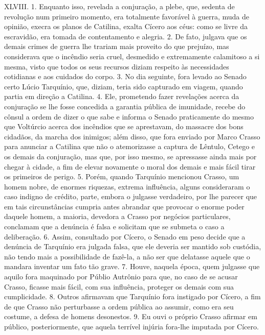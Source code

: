 XLVIII. 1. Enquanto isso, revelada a conjuração, a plebe, que, sedenta de
revolução num primeiro momento, era totalmente favorável à guerra, muda de
opinião, execra os planos de Catilina, exalta Cícero aos céus: como se livre da
escravidão, era tomada de contentamento e alegria. 2. De fato, julgava que os
demais crimes de guerra lhe trariam mais proveito do que prejuízo, mas
considerava que o incêndio seria cruel, desmedido e extremamente calamitoso a
si mesma, visto que todos os seus recursos diziam respeito às necessidades
cotidianas e aos cuidados do corpo. 3. No dia seguinte, fora levado ao Senado
certo Lúcio Tarquínio, que, diziam, teria sido capturado em viagem, quando
partia em direção a Catilina. 4. Ele, prometendo fazer revelações acerca da
conjuração se lhe fosse concedida a garantia pública de imunidade, recebe do
cônsul a ordem de dizer o que sabe e informa o Senado praticamente do mesmo que
Voltúrcio acerca dos incêndios que se aprestavam, do massacre dos bons
cidadãos, da marcha dos inimigos; além disso, que fora enviado por Marco Crasso
para anunciar a Catilina que não o atemorizasse a captura de Lêntulo, Cetego e
os demais da conjuração, mas que, por isso mesmo, se apressasse ainda mais por
chegar à cidade, a fim de elevar novamente o moral dos demais e mais fácil
tirar os primeiros de perigo. 5. Porém, quando Tarquínio mencionou Crasso, um
homem nobre, de enormes riquezas, extrema influência, alguns consideraram o
caso indigno de crédito, parte, embora o julgasse verdadeiro, por lhe parecer
que em tais circunstâncias cumpria antes abrandar que provocar o enorme poder
daquele homem, a maioria, devedora a Crasso por negócios particulares,
conclamam que a denúncia é falsa e solicitam que se submeta o caso a
deliberação. 6. Assim, consultado por Cícero, o Senado em peso decide que a
denúncia de Tarquínio era julgada falsa, que ele deveria ser mantido sob
custódia, não tendo mais a possibilidade de fazê-la, a não ser que delatasse aquele que
o mandara inventar um fato tão grave. 7. Houve, naquela época, quem julgasse
que aquilo fora maquinado por Públio Autrônio para que, no caso de se acusar
Crasso, ficasse mais fácil, com sua influência, proteger os demais com sua
cumplicidade. 8. Outros afirmavam que Tarquínio fora instigado por Cícero, a
fim de que Crasso não perturbasse a ordem pública ao assumir, como era seu
costume, a defesa de homens desonestos. 9. Eu ouvi o próprio Crasso afirmar em
público, posteriormente, que aquela terrível injúria fora-lhe imputada por
Cícero.

